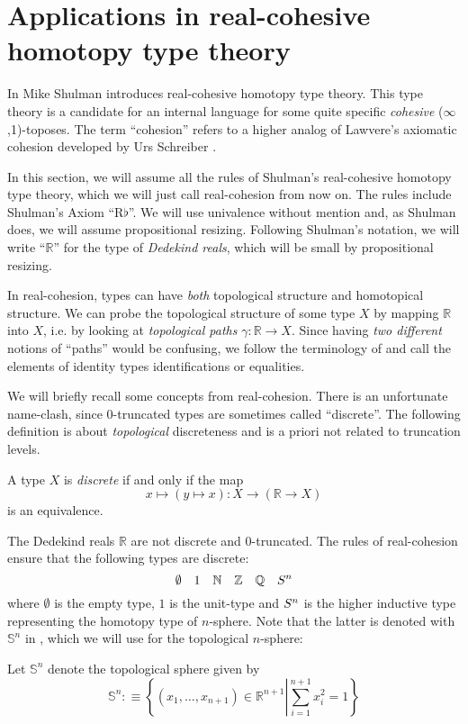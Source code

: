\documentclass[9pt,twosided]{amsart}
\newcommand{\bN}{\mathbb N}
\newcommand{\bZ}{\mathbb Z}
\newcommand{\bQ}{\mathbb Q}
\newcommand{\bR}{\mathbb R}
\newcommand{\bS}{\mathbb S}
\begin{document}
\section{Applications in real-cohesive homotopy type theory}
\label{subsection:toplogical stacks}

In \cite[Section 8]{ShulmanRealCohesion} Mike Shulman introduces real-cohesive homotopy type theory.
This type theory is a candidate for an internal language for some quite specific \emph{cohesive} ($\infty$,1)-toposes.
The term ``cohesion'' refers to a higher analog 
of Lawvere's axiomatic cohesion \cite{Lawvere07} developed by Urs Schreiber \cite{SchreiberDcct}.

In this section, we will assume all the rules of Shulman's real-cohesive homotopy type theory,
which we will just call real-cohesion from now on.
The rules include Shulman's Axiom ``$\mathrm{R}\flat$''.
We will use univalence without mention and, as Shulman does, we will assume propositional resizing.
Following Shulman's notation, we will write  ``$\bR$'' for the type of \emph{Dedekind reals}, which will be small by propositional resizing.

In real-cohesion, types can have \emph{both} topological structure and homotopical structure.
We can probe the topological structure of some type $X$ by mapping $\bR$ into $X$,
i.e. by looking at \emph{topological paths} $\gamma:\bR\to X$.
Since having \emph{two different} notions of ``paths'' would be confusing,
we follow the terminology of \cite{ShulmanRealCohesion} and call the elements of identity types identifications or equalities.

We will briefly recall some concepts from real-cohesion.
There is an unfortunate name-clash, since 0-truncated types are sometimes called ``discrete''.
The following definition is about \emph{topological} discreteness and is a priori not related to truncation levels.
\begin{defn}
  A type $X$ is \emph{discrete} if and only if the map
  \[ x\mapsto (y\mapsto x) : X \to (\bR \to X) \]
  is an equivalence.
\end{defn}
The Dedekind reals $\bR$ are not discrete and 0-truncated.
The rules of real-cohesion ensure that the following types are discrete:
\[ \emptyset \quad 1 \quad \bN \quad \bZ \quad \bQ \quad \sphere{n} \]
where $\emptyset$ is the empty type,
$1$ is the unit-type and $S^{n}$ is the higher inductive type representing the homotopy type of $n$-sphere.
Note that the latter is denoted with $\bS^n$ in \cite{UFP}, which we will use for the topological $n$-sphere:
\begin{defn}
  Let $\bS^{n}$ denote the topological sphere given by
  \[ \bS^{n}:\equiv\left\{ (x_1,\dots,x_{n+1})\in\bR^{n+1}\left\vert \sum_{i=1}^{n+1}x_i^2=1\right.\right\}\]
\end{defn}
\end{document}
